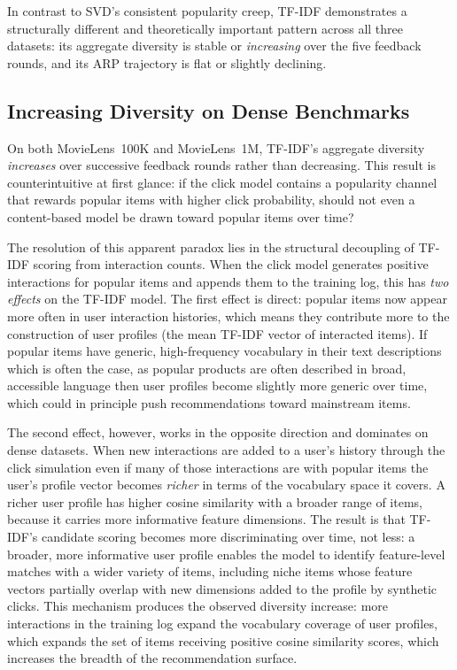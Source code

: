 \documentclass[11pt,a4paper]{report}
\begin{document}
In contrast to SVD's consistent popularity creep, TF-IDF demonstrates a structurally different and theoretically important pattern across all three datasets: its aggregate diversity is stable or \emph{increasing} over the five feedback rounds, and its ARP trajectory is flat or slightly declining.

\subsection*{Increasing Diversity on Dense Benchmarks}

On both MovieLens~100K and MovieLens~1M, TF-IDF's aggregate diversity \emph{increases} over successive feedback rounds rather than decreasing. This result is counterintuitive at first glance: if the click model contains a popularity channel that rewards popular items with higher click probability, should not even a content-based model be drawn toward popular items over time?

The resolution of this apparent paradox lies in the structural decoupling of TF-IDF scoring from interaction counts. When the click model generates positive interactions for popular items and appends them to the training log, this has \emph{two effects} on the TF-IDF model. The first effect is direct: popular items now appear more often in user interaction histories, which means they contribute more to the construction of user profiles (the mean TF-IDF vector of interacted items). If popular items have generic, high-frequency vocabulary in their text descriptions which is often the case, as popular products are often described in broad, accessible language then user profiles become slightly more generic over time, which could in principle push recommendations toward mainstream items.

The second effect, however, works in the opposite direction and dominates on dense datasets. When new interactions are added to a user's history through the click simulation even if many of those interactions are with popular items the user's profile vector becomes \emph{richer} in terms of the vocabulary space it covers. A richer user profile has higher cosine similarity with a broader range of items, because it carries more informative feature dimensions. The result is that TF-IDF's candidate scoring becomes more discriminating over time, not less: a broader, more informative user profile enables the model to identify feature-level matches with a wider variety of items, including niche items whose feature vectors partially overlap with new dimensions added to the profile by synthetic clicks. This mechanism produces the observed diversity increase: more interactions in the training log expand the vocabulary coverage of user profiles, which expands the set of items receiving positive cosine similarity scores, which increases the breadth of the recommendation surface.
\end{document}
